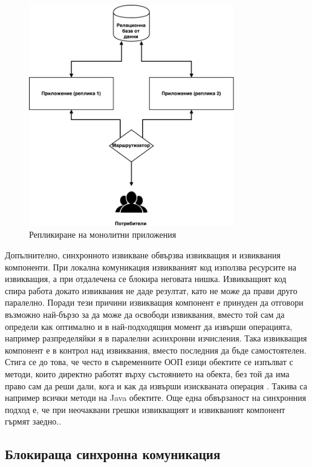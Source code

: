 \begin{figure}
  \centering\includegraphics[width=0.8\textwidth]{images/monolithic-application-replication.pdf}
  \caption{Репликиране на монолитни приложения}
  \label{fig:monolithic-replication}
\end{figure}

Допълнително, синхронното извикване обвързва извикващия и извиквания компоненти. При локална комуникация извикваният код използва ресурсите на извикващия, а при отдалечена се блокира неговата нишка. Извикващият код спира работа докато извиквания не даде резултат, като не може да прави друго паралелно. Поради тези причини извикващия компонент е принуден да отговори възможно най-бързо за да може да освободи извиквания, вместо той сам да определи как оптимално и в най-подходящия момент да извърши операцията, например разпределяйки я в паралелни асинхронни изчисления. Така извикващия компонент е в контрол над извиквания, вместо последния да бъде самостоятелен. Стига се до това, че често в съвременните ООП езици обектите се изпълват с методи, които директно работят върху състоянието на обекта, без той да има право сам да реши дали, кога и как да извърши изискваната операция \cite{kuhn2015ReactiveDesignPatterns}. Такива са например всички  методи на Java обектите. Още една обвързаност на синхронния подход е, че при неочаквани грешки извикващият и извикваният компонент гърмят заедно..

\subsection{Блокираща синхронна комуникация}

